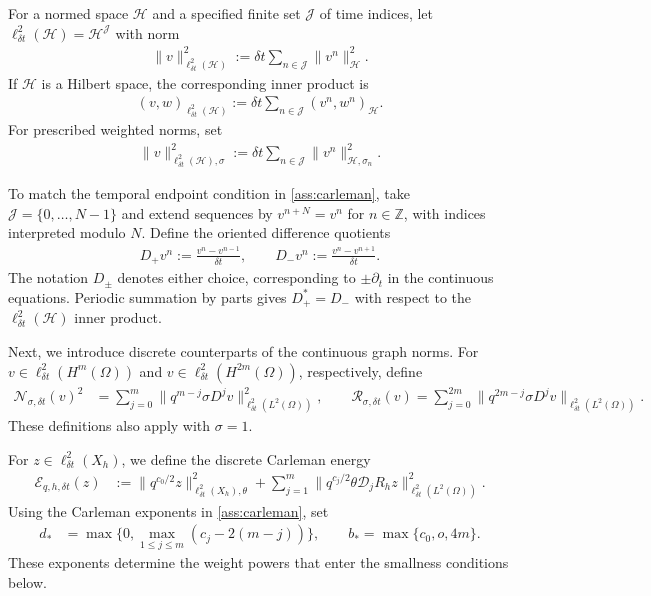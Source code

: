 \documentclass[print,wide,eng]{draft}
\begin{document}
For a normed space $\mathcal H$ and a specified finite set $\mathcal J$ of time indices, let $\ell_{\delta t}^2(\mathcal H)=\mathcal H^{\mathcal J}$ with norm
\begin{align*}
\|v\|_{\ell_{\delta t}^2(\mathcal H)}^2
:={\delta t}\sum_{n\in\mathcal J}\|v^n\|_{\mathcal H}^2.
\end{align*}
If $\mathcal H$ is a Hilbert space, the corresponding inner product is
\begin{align*}
(v,w)_{\ell_{\delta t}^2(\mathcal H)}
:={\delta t}\sum_{n\in\mathcal J}(v^n,w^n)_{\mathcal H}.
\end{align*}
For prescribed weighted norms, set
\begin{align*}
\|v\|_{\ell_{\delta t}^2(\mathcal H),\sigma}^2
:={\delta t}\sum_{n\in\mathcal J}\|v^n\|_{\mathcal H,\sigma_n}^2.
\end{align*}

To match the temporal endpoint condition in \cref{ass:carleman}, take $\mathcal J=\{0,\ldots,N-1\}$ and extend sequences by $v^{n+N}=v^n$ for $n\in\mathbb Z$, with indices interpreted modulo $N$. Define the oriented difference quotients
\begin{align*}
D_+v^n:=\frac{v^n-v^{n-1}}{{\delta t}},\qquad
D_-v^n:=\frac{v^n-v^{n+1}}{{\delta t}}.
\end{align*}
The notation $D_\pm$ denotes either choice, corresponding to $\pm\partial_t$ in the continuous equations. Periodic summation by parts gives $D_+^*=D_-$ with respect to the $\ell_{\delta t}^2(\mathcal H)$ inner product.

Next, we introduce discrete counterparts of the continuous graph norms. For $v\in\ell_{\delta t}^2(H^m(\Omega))$ and $v\in\ell_{\delta t}^2(H^{2m}(\Omega))$, respectively, define
\begin{align*}
\mathcal N_{\sigma,{\delta t}}(v)^2
&=\sum_{j=0}^m\|q^{m-j}\sigma D^jv\|_{\ell_{\delta t}^2(L^2(\Omega))}^2,\qquad
\mathcal R_{\sigma,{\delta t}}(v)
=\sum_{j=0}^{2m}\|q^{2m-j}\sigma D^jv\|_{\ell_{\delta t}^2(L^2(\Omega))}.
\end{align*}
These definitions also apply with $\sigma=1$.

For $z\in\ell_{\delta t}^2(X_h)$, we define the discrete Carleman energy
\begin{align}\label{eq:discreteenergy}
\mathcal{E}_{q,h,{\delta t}}(z)&:=\|q^{c_0/2}z\|_{\ell_{\delta t}^2(X_h),\theta}^2+
\sum_{j=1}^m\|q^{c_j/2}\theta\mathcal D_jR_hz\|_{\ell_{\delta t}^2(L^2(\Omega))}^2.
\end{align}
Using the Carleman exponents in \cref{ass:carleman}, set
\begin{align}
d_*&=\max\{0,\max_{1\leq j\leq m}(c_j-2(m-j))\},\qquad
b_*=\max\{c_0,o,4m\}.\label{eq:transfer-exponents}
\end{align}
These exponents determine the weight powers that enter the smallness conditions below.
\end{document}
